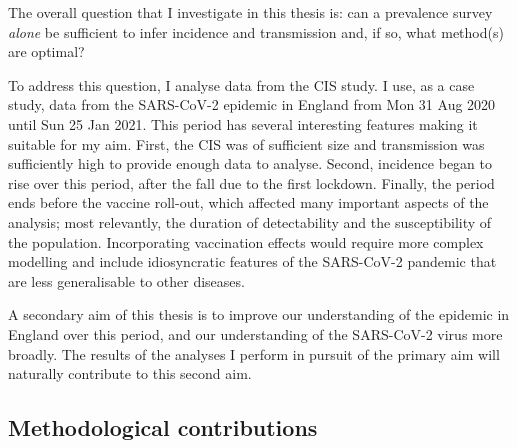 \documentclass[thesis.tex]{subfiles}
\begin{document}
The overall question that I investigate in this thesis is: can a prevalence survey \emph{alone} be sufficient to infer incidence and transmission and, if so, what method(s) are optimal?

To address this question, I analyse data from the CIS study.
I use, as a case study, data from the SARS-CoV-2 epidemic in England from Mon 31 Aug 2020 until Sun 25 Jan 2021.
This period has several interesting features making it suitable for my aim.
First, the CIS was of sufficient size and transmission was sufficiently high to provide enough data to analyse.
Second, incidence began to rise over this period, after the
fall due to the first lockdown.
Finally, the period ends before the vaccine roll-out, which  affected many important aspects of the analysis; most relevantly, the duration of detectability and the susceptibility of the population.
Incorporating vaccination effects would require more complex modelling and include idiosyncratic features of the SARS-CoV-2 pandemic that are less generalisable to other diseases.

A secondary aim of this thesis is to improve our understanding of the epidemic in England over this period, and our understanding of the SARS-CoV-2 virus more broadly.
The results of the analyses I perform in pursuit of the primary aim will naturally contribute to this second aim.

\subsection{Methodological contributions}
\end{document}
